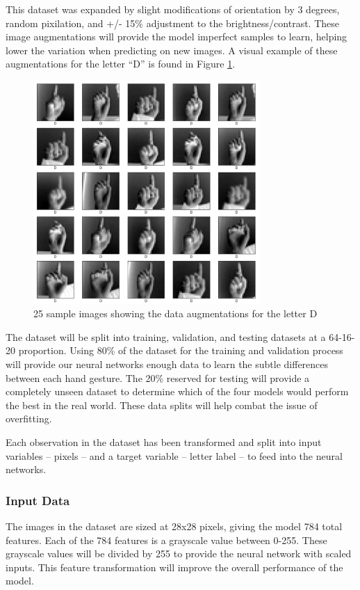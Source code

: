 \documentclass[5p,authoryear]{elsarticle}
\begin{document}
This dataset was expanded by slight modifications of orientation by 3 degrees, random pixilation, and +/- 15\% adjustment to the brightness/contrast. These image augmentations will provide the model imperfect samples to learn, helping lower the variation when predicting on new images. A visual example of these augmentations for the letter “D” is found in Figure \ref{American_Sign}.

\begin{figure}[!htb] \centering
	\includegraphics[width=3.4in]{figures/Sign-Language-D.png}
	\caption[]{25 sample images showing the data augmentations for the letter D} 
	\label{American_Sign} 
\end{figure}


The dataset will be split into training, validation, and testing datasets at a 64-16-20 proportion. Using 80\% of the dataset for the training and validation process will provide our neural networks enough data to learn the subtle differences between each hand gesture. The 20\% reserved for testing will provide a completely unseen dataset to determine which of the four models would perform the best in the real world. These data splits will help combat the issue of overfitting.

Each observation in the dataset has been transformed and split into input variables – pixels – and a target variable – letter label – to feed into the neural networks.  


\subsubsection{Input Data}

The images in the dataset are sized at 28x28 pixels, giving the model 784 total features. Each of the 784 features is a grayscale value between 0-255. These grayscale values will be divided by 255 to provide the neural network with scaled inputs. This feature transformation will improve the overall performance of the model. 
\end{document}
